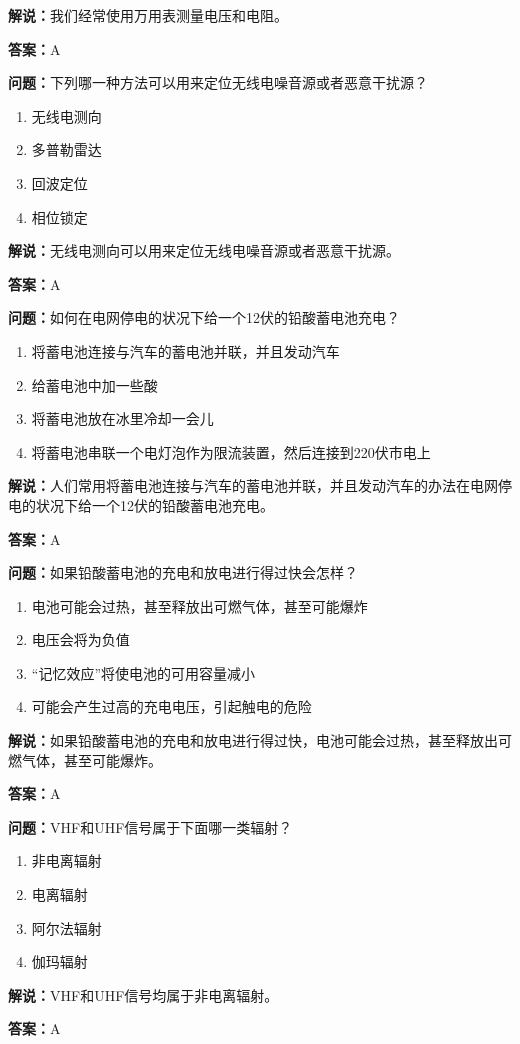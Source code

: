 \textbf{解说：}我们经常使用万用表测量电压和电阻。%

\textbf{答案：}A

\textbf{问题：}下列哪一种方法可以用来定位无线电噪音源或者恶意干扰源？

\begin{enumerate}[label=\Alph*), leftmargin=3em]
	\item 无线电测向
	\item 多普勒雷达
	\item 回波定位
	\item 相位锁定
\end{enumerate}

\textbf{解说：}无线电测向可以用来定位无线电噪音源或者恶意干扰源。%

\textbf{答案：}A

\textbf{问题：}如何在电网停电的状况下给一个12伏的铅酸蓄电池充电？

\begin{enumerate}[label=\Alph*), leftmargin=3em]
	\item 将蓄电池连接与汽车的蓄电池并联，并且发动汽车
	\item 给蓄电池中加一些酸
	\item 将蓄电池放在冰里冷却一会儿
	\item 将蓄电池串联一个电灯泡作为限流装置，然后连接到220伏市电上
\end{enumerate}

\textbf{解说：}人们常用将蓄电池连接与汽车的蓄电池并联，并且发动汽车的办法在电网停电的状况下给一个12伏的铅酸蓄电池充电。%

\textbf{答案：}A

\textbf{问题：}如果铅酸蓄电池的充电和放电进行得过快会怎样？

\begin{enumerate}[label=\Alph*), leftmargin=3em]
	\item 电池可能会过热，甚至释放出可燃气体，甚至可能爆炸
	\item 电压会将为负值
	\item “记忆效应”将使电池的可用容量减小
	\item 可能会产生过高的充电电压，引起触电的危险
\end{enumerate}

\textbf{解说：}如果铅酸蓄电池的充电和放电进行得过快，电池可能会过热，甚至释放出可燃气体，甚至可能爆炸。%

\textbf{答案：}A

\textbf{问题：}VHF和UHF信号属于下面哪一类辐射？

\begin{enumerate}[label=\Alph*), leftmargin=3em]
	\item 非电离辐射
	\item 电离辐射
	\item 阿尔法辐射
	\item 伽玛辐射
\end{enumerate}

\textbf{解说：}VHF和UHF信号均属于非电离辐射。%

\textbf{答案：}A